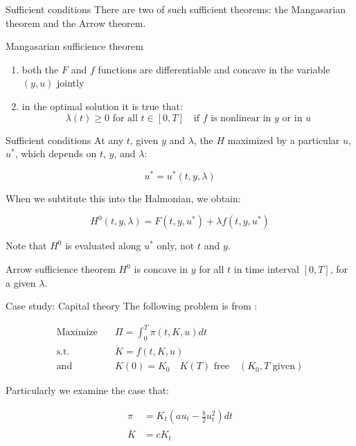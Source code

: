 \documentclass[10pt]{beamer}
\begin{document}
\begin{frame}[label={sec:org2a1c6bb}]{Sufficient conditions}
There are two of such sufficient theorems: the \alert{Mangasarian theorem} and the \alert{Arrow theorem}.
\begin{block}{Mangasarian sufficience theorem}
\begin{enumerate}
\item both the \(F\) and \(f\) functions are differentiable and concave in the variable \((y, u)\) jointly
\item in the optimal solution it is true that:
$$
   \lambda(t) \geq 0 \text{ for all } t \in [0, T] \quad \text{if } f \text{ is nonlinear in } y \text{ or in } u
   $$
\end{enumerate}
\end{block}
\end{frame}
\begin{frame}[label={sec:orgd4de71d}]{Sufficient conditions}
At any \(t\), given \(y\) and \(\lambda\), the \(H\) maximized by a particular \(u\), \(u^{*}\), which depends on \(t\), \(y\), and \(\lambda\):

$$
u^{*} =u^{*}(t, y, \lambda)
$$

When we subtitute this into the Halmonian, we obtain:

$$
H^{0}(t, y, \lambda) = F(t,y,u^{*}) + \lambda f(t,y,u^{*})
$$

Note that \(H^{0}\) is evaluated along \(u^{*}\) only, not \(t\) and \(y\).

\begin{block}{Arrow sufficience theorem}
\(H^{0}\) is concave in \(y\) for all \(t\) in  time interval \([0, T]\), for a given \(\lambda\).
\end{block}
\end{frame}

\begin{frame}[label={sec:org45202a3}]{Case study: Capital theory}
The following problem is from \textcite{Dorfman1969}:

\begin{align*}
\text{Maximize} \quad & \Pi = \int_0^{T} \pi(t, K, u) dt \\
\text{s.t.} \quad     & \dot{K} = f(t, K, u) \\
\text{and} \quad      & K(0) = K_{0} \quad K(T) \text{ free} \quad (K_{0}, T \text{ given})
\end{align*}

Particularly we examine the case that:

\begin{align*}
\pi & = K_t(au_t - \frac{b}{2}u_t^2) dt \\
\dot{K} & = c K_t
\end{align*}
\end{frame}
\end{document}
